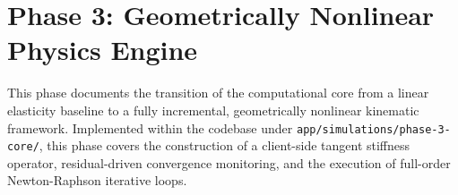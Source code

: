 \section{Phase 3: Geometrically Nonlinear Physics Engine}
\label{sec:phase3}

This phase documents the transition of the computational core from a linear elasticity baseline to a fully incremental, geometrically nonlinear kinematic framework. Implemented within the codebase under \texttt{app/simulations/phase-3-core/}, this phase covers the construction of a client-side tangent stiffness operator, residual-driven convergence monitoring, and the execution of full-order Newton-Raphson iterative loops.



